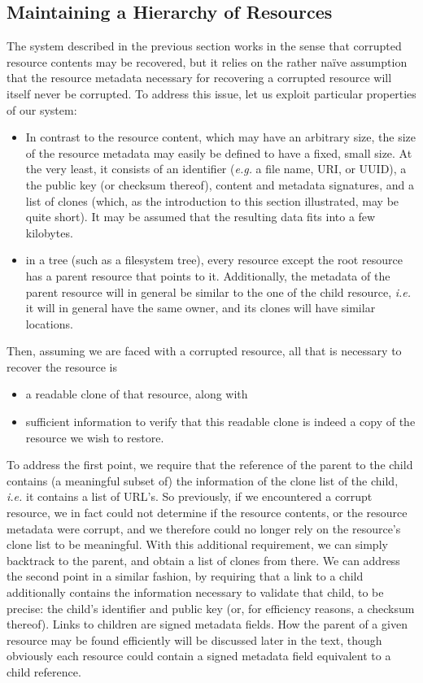 \documentclass[11pt]{article}
\begin{document}
\begin{mainmatter}
\subsection{Maintaining a Hierarchy of Resources}
\label{hierarchy}
The system described in the previous section works in the sense that corrupted resource contents may be recovered, but it relies on the rather na\"ive assumption that the resource metadata necessary for recovering a corrupted resource will itself never be corrupted. To address this issue, let us exploit particular properties of our system:
\begin{itemize} 
\item In contrast to the resource content, which may have an arbitrary size, the size of the resource metadata may easily be defined to have a fixed, small size. At the very least, it consists of an identifier (\emph{e.g.} a file name, URI, or UUID), a the public key (or checksum thereof), content and metadata signatures, and a list of clones (which, as the introduction to this section illustrated, may be quite short). It may be assumed that the resulting data fits into a few kilobytes.
\item in a tree (such as a filesystem tree), every resource except the root resource has a parent resource that points to it. Additionally, the metadata of the parent resource will in general be similar to the one of the child resource, \emph{i.e.} it will in general have the same owner, and its clones will have similar locations.
\end{itemize}

Then, assuming we are faced with a corrupted resource, all that is necessary to recover the resource is 
\begin{itemize}
\item a readable clone of that resource, along with 
\item sufficient information to verify that this readable clone is indeed a copy of the resource we wish to restore.
\end{itemize}

To address the first point, we require that the reference of the parent to the child contains (a meaningful subset of) the information of the clone list of the child, \emph{i.e.} it contains a list of URL's. So previously, if we encountered a corrupt resource, we in fact could not determine if the resource contents, or the resource metadata were corrupt, and we therefore could no longer rely on the resource's clone list to be meaningful. With this additional requirement, we can simply backtrack to the parent, and obtain a list of clones from there. We can address the second point in a similar fashion, by requiring that a link to a child additionally contains the information necessary to validate that child, to be precise: the child's identifier and public key (or, for efficiency reasons, a checksum thereof). Links to children are signed metadata fields. How the parent of a given resource may be found efficiently will be discussed later in the text, though obviously each resource could contain a signed metadata field equivalent to a child reference.


\end{mainmatter}
\end{document}
